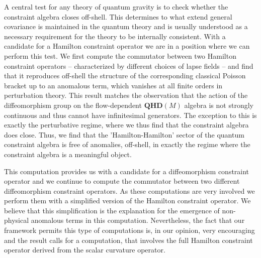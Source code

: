 \documentclass[12pt]{article}
\begin{document}
A central test for any theory of quantum gravity is to check whether the constraint algebra closes off-shell. This determines to what extend general covariance is maintained in the quantum theory and is usually understood as a necessary requirement for the theory to be internally consistent. With a candidate for a Hamilton constraint operator we are in a position where we can perform this test. We first compute the commutator between two Hamilton constraint operators -- characterized by different choices of lapse fields -- and find that it reproduces off-shell the structure of the corresponding classical Poisson bracket up to an anomalous term, which vanishes at all finite orders in perturbation theory. This result matches the observation that the action of the diffeomorphism group on the flow-dependent $\mathbf{QHD}(M)$ algebra is not strongly continuous and thus cannot have infinitesimal generators. The exception to this is exactly the perturbative regime, where we thus find that the constraint algebra does close. Thus, we find that the 'Hamilton-Hamilton' sector of the quantum constraint algebra is free of anomalies, off-shell, in exactly the regime where the constraint algebra is a meaningful object.

This computation provides us with a candidate for a diffeomorphism constraint operator and we continue to compute the commutator between two different diffeomorphism constraint operators. As these computations are very involved we perform them with a simplified version of the Hamilton constraint operator. We believe that this simplification is the explanation for the emergence of non-physical anomalous terms in this computation. %
Nevertheless, the fact that our framework permits this type of computations is, in our opinion, very encouraging and the result calls for a computation, that involves the full Hamilton constraint operator derived from the scalar curvature operator.
\end{document}
